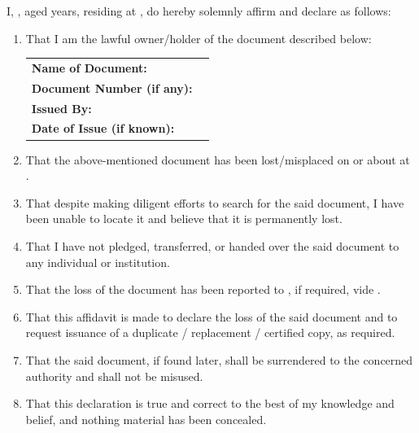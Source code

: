 
I, \deponentName{}, aged \deponentAge{} years, residing at \deponentAddress{}, do hereby solemnly affirm and declare as follows:

\begin{enumerate}
  \item That I am the lawful owner/holder of the document described below:

\begin{tabular}{p{6cm} p{10cm}}
\textbf{Name of Document:} & \documentName{} \\ 
\textbf{Document Number (if any):} & \documentNumber{} \\ 
\textbf{Issued By:} & \documentIssuanceAuthority{}\\ 
\textbf{Date of Issue (if known):} & \documentIssuanceDate{} \\ 
\end{tabular}
  
  \item That the above-mentioned document has been lost/misplaced on or about \lossDate{}  at \lossPlace{}.
  \item That despite making diligent efforts to search for the said document, I have been unable to locate it and believe that it is permanently lost.
  \item That I have not pledged, transferred, or handed over the said document to any individual or institution.
  \item That the loss of the document has been reported to \policeStation{}, if required, vide \policeDeclaration{}.
  \item That this affidavit is made to declare the loss of the said document and to request issuance of a duplicate / replacement / certified copy, as required.
  \item That the said document, if found later, shall be surrendered to the concerned authority and shall not be misused.
  \item That this declaration is true and correct to the best of my knowledge and belief, and nothing material has been concealed.
\end{enumerate}

\vspace*{0.5cm}

